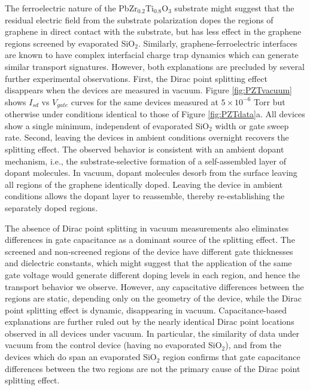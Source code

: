 \documentclass[edeposit,fullpage,draftthesis]{uiucthesis2009}
\begin{document}
        The ferroelectric nature of the PbZr$_{0.2}$Ti$_{0.8}$O$_3$ substrate might suggest that the residual electric field from the substrate polarization dopes the regions of graphene in direct contact with the substrate\cite{Baeumer2013,Zheng2010}, but has less effect in the graphene regions screened by evaporated SiO$_2$. Similarly, graphene-ferroelectric interfaces are known to have complex interfacial charge trap dynamics which can generate similar transport signatures\cite{Park2015b}. However, both explanations are precluded by several further experimental observations. First, the Dirac point splitting effect disappears when the devices are measured in vacuum. Figure \ref{fig:PZTvacuum} shows $I_{sd}$ vs $V_{gate}$ curves for the same devices measured at $5\times10^{-6}$ Torr but otherwise under conditions identical to those of Figure \ref{fig:PZTdata}a. All devices show a single minimum, independent of evaporated SiO$_2$ width or gate sweep rate. Second, leaving the devices in ambient conditions overnight recovers the splitting effect. The observed behavior is consistent with an ambient dopant mechanism, i.e., the substrate-selective formation of a self-assembled layer of dopant molecules. In vacuum, dopant molecules desorb from the surface leaving all regions of the graphene identically doped. Leaving the device in ambient conditions allows the dopant layer to reassemble, thereby re-establishing the separately doped regions.

        The absence of Dirac point splitting in vacuum measurements also eliminates differences in gate capacitance as a dominant source of the splitting effect. The screened and non-screened regions of the device have different gate thicknesses and dielectric constants, which might suggest that the application of the same gate voltage would generate different doping levels in each region, and hence the transport behavior we observe. However, any capacitative differences between the regions are static, depending only on the geometry of the device, while the Dirac point splitting effect is dynamic, disappearing in vacuum. Capacitance-based explanations are further ruled out by the nearly identical Dirac point locations observed in all devices under vacuum. In particular, the similarity of data under vacuum from the control device (having no evaporated SiO$_2$), and from the devices which do span an evaporated SiO$_2$ region confirms that gate capacitance differences between the two regions are not the primary cause of the Dirac point splitting effect.
\end{document}
